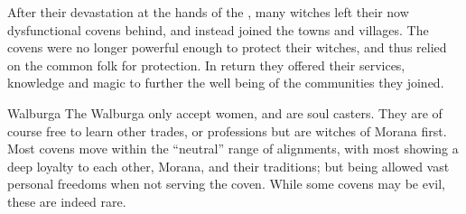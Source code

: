 
After their devastation at the hands of the , many
witches left their now dysfunctional covens behind, and instead joined the
towns and villages. The covens were no longer powerful enough to protect their
witches, and thus relied on the common folk for protection. In return they
offered their services, knowledge and magic to further the well being of the
communities they joined.


\begin{35e}{Walburga}
  The Walburga only accept women, and are soul casters. They are of course free
  to learn other trades, or professions but are witches of Morana first. Most
  covens move within the ``neutral'' range of alignments, with most showing a
  deep loyalty to each other, Morana, and their traditions; but being allowed
  vast personal freedoms when not serving the coven. While some covens may be
  evil, these are indeed rare.
\end{35e}
